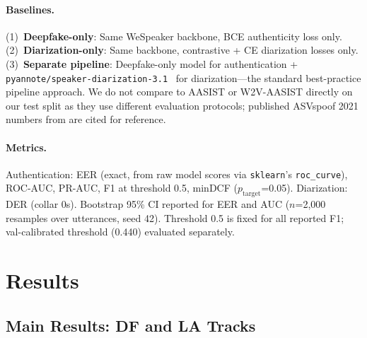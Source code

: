 \documentclass{article}
\begin{document}
\paragraph{Baselines.}
(1)~\textbf{Deepfake-only}: Same WeSpeaker backbone, BCE authenticity loss
only. (2)~\textbf{Diarization-only}: Same backbone, contrastive + CE
diarization losses only. (3)~\textbf{Separate pipeline}: Deepfake-only model
for authentication + \texttt{pyannote/speaker-diarization-3.1}~\citep{plaquet2023powerset}
for diarization---the standard best-practice pipeline approach. We do not
compare to AASIST or W2V-AASIST directly on our test split as they use
different evaluation protocols; published ASVspoof 2021 numbers from
\citet{liu2021asvspoof} are cited for reference.

\paragraph{Metrics.}
Authentication: EER (exact, from raw model scores via \texttt{sklearn}'s
\texttt{roc\_curve}), ROC-AUC, PR-AUC, F1 at threshold 0.5, minDCF
($p_{\text{target}}$=0.05). Diarization: DER (collar 0s). Bootstrap 95\% CI
reported for EER and AUC ($n$=2{,}000 resamples over utterances, seed 42).
Threshold 0.5 is fixed for all reported F1; val-calibrated threshold (0.440)
evaluated separately.

\section{Results}

\subsection{Main Results: DF and LA Tracks}
\end{document}
